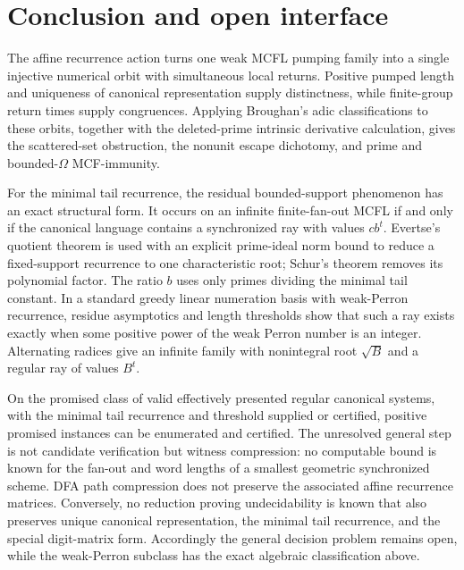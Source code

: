 \section{Conclusion and open interface}\label{sec:conclusion}

The affine recurrence action turns one weak MCFL pumping family into a
single injective numerical orbit with simultaneous local returns. Positive
pumped length and uniqueness of canonical representation supply
distinctness, while finite-group return times supply congruences. Applying
Broughan's adic classifications to these orbits,
together with the deleted-prime intrinsic derivative calculation, gives the
scattered-set obstruction, the nonunit escape dichotomy, and prime and
bounded-\(\Omega\) MCF-immunity.

For the minimal tail recurrence, the residual bounded-support phenomenon
has an exact structural form. It occurs on an infinite finite-fan-out MCFL
if and only if the canonical language contains a synchronized ray with
values \(cb^t\). Evertse's quotient theorem is used with an explicit
prime-ideal norm bound to reduce a fixed-support recurrence to one
characteristic root; Schur's theorem removes its polynomial factor. The
ratio \(b\) uses only primes dividing the minimal tail constant. In a
standard greedy linear numeration basis with weak-Perron recurrence, residue
asymptotics and length thresholds show that such a ray exists exactly when
some positive power of the weak Perron number is an integer. Alternating
radices give an infinite family with nonintegral root \(\sqrt B\) and a
regular ray of values \(B^t\).

On the promised class of valid effectively presented regular canonical
systems, with the minimal tail recurrence and threshold supplied or
certified, positive promised instances can be enumerated and certified. The unresolved general step is not
candidate verification but witness compression: no computable bound is
known for the fan-out and word lengths of a smallest geometric synchronized
scheme. DFA path compression does not preserve the associated affine
recurrence matrices. Conversely, no reduction proving undecidability is
known that also preserves unique canonical representation, the minimal tail
recurrence, and the special digit-matrix form.
Accordingly the general decision problem remains open, while the
weak-Perron subclass has the exact algebraic classification above.

